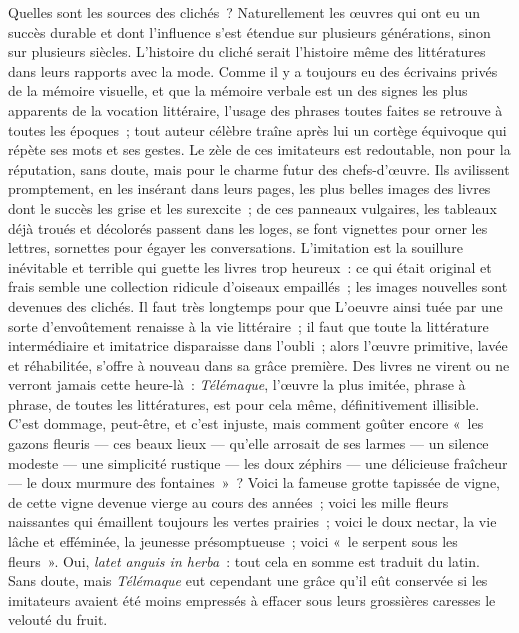 \documentclass[french,twoside]{book} %
\begin{document}
Quelles sont les sources des clichés ? Naturellement les œuvres qui ont eu un succès durable et dont l’influence s’est étendue sur plusieurs générations, sinon sur plusieurs siècles. L’histoire du cliché serait l’histoire même des littératures dans leurs rapports avec la mode. Comme il y a toujours eu des écrivains privés de la mémoire visuelle, et que la mémoire verbale est un des signes les plus apparents de la vocation littéraire, l’usage des phrases toutes faites se retrouve à toutes les époques ; tout auteur célèbre traîne après lui un cortège équivoque qui répète ses mots et ses gestes. Le zèle de ces imitateurs est redoutable, non pour la réputation, sans doute, mais pour le charme futur des chefs-d’œuvre. Ils avilissent promptement, en les insérant dans leurs pages, les plus belles images des livres dont le succès les grise et les surexcite ; de ces panneaux vulgaires, les tableaux déjà troués et décolorés passent dans les loges, se font vignettes pour orner les lettres, sornettes pour égayer les conversations. L’imitation est la souillure inévitable et terrible qui guette les livres trop heureux : ce qui était original et frais semble une collection ridicule d’oiseaux empaillés ; les images nouvelles sont devenues des clichés. Il faut très longtemps pour que L’oeuvre ainsi tuée par une sorte d’envoûtement renaisse à la vie littéraire ; il faut que toute la littérature intermédiaire et imitatrice disparaisse dans l’oubli ; alors l’œuvre primitive, lavée et réhabilitée, s’offre à nouveau dans sa grâce première. Des livres ne virent ou ne verront jamais cette heure-là : {\itshape Télémaque}, l’œuvre la plus imitée, phrase à phrase, de toutes les littératures, est pour cela même, définitivement illisible. C’est dommage, peut-être, et c’est injuste, mais comment goûter encore « les gazons fleuris — ces beaux lieux — qu’elle arrosait de ses larmes — un silence modeste — une simplicité rustique — les doux zéphirs — une délicieuse fraîcheur — le doux murmure des fontaines » ? Voici la fameuse grotte tapissée de vigne, de cette vigne devenue vierge au cours des années ; voici les mille fleurs naissantes qui émaillent toujours les vertes prairies ; voici le doux nectar, la vie lâche et efféminée, la jeunesse présomptueuse ; voici « le serpent sous les fleurs ». Oui, {\itshape latet anguis in herba} : tout cela en somme est traduit du latin. Sans doute, mais {\itshape Télémaque} eut cependant une grâce qu’il eût conservée si les imitateurs avaient été moins empressés à effacer sous leurs grossières caresses le velouté du fruit.\par
\end{document}
